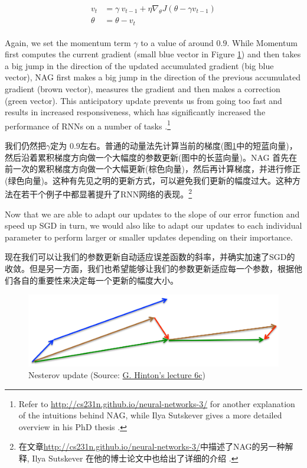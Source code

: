 \documentclass{article}
\begin{document}
\begin{align}
\begin{split}
v_t &= \gamma \: v_{t-1} + \eta \nabla_\theta J( \theta - \gamma v_{t-1})\\
\theta &= \theta - v_t
\end{split}
\end{align}

Again, we set the momentum term $\gamma$ to a value of around $0.9$. While Momentum first computes the current gradient (small blue vector in Figure \ref{fig:nesterov update}) and then takes a big jump in the direction of the updated accumulated gradient (big blue vector), NAG first makes a big jump in the direction of the previous accumulated gradient (brown vector), measures the gradient and then makes a correction (green vector). This anticipatory update prevents us from going too fast and results in increased responsiveness, which has significantly increased the performance of RNNs on a number of tasks \cite{Bengio2012a}.\footnote{Refer to \url{http://cs231n.github.io/neural-networks-3/} for another explanation of the intuitions behind NAG, while Ilya Sutskever gives a more detailed overview in his PhD thesis \cite{Sutskever2013a}.}

我们仍然把$\gamma$定为 $0.9$左右。普通的动量法先计算当前的梯度(图\ref{fig:nesterov update}中的短蓝向量)，然后沿着累积梯度方向做一个大幅度的参数更新(图中的长蓝向量)。NAG 首先在前一次的累积梯度方向做一个大幅更新(棕色向量)，然后再计算梯度，并进行修正(绿色向量)。这种有先见之明的更新方式，可以避免我们更新的幅度过大。这种方法在若干个例子中都显著提升了RNN网络的表现\cite{Bengio2012a}。\footnote{在文章\url{http://cs231n.github.io/neural-networks-3/}中描述了NAG的另一种解释, Ilya Sutskever 在他的博士论文中也给出了详细的介绍 \cite{Sutskever2013a}.}

Now that we are able to adapt our updates to the slope of our error function and speed up SGD in turn, we would also like to adapt our updates to each individual parameter to perform larger or smaller updates depending on their importance.

现在我们可以让我们的参数更新自动适应误差函数的斜率，并确实加速了SGD的收敛。但是另一方面，我们也希望能够让我们的参数更新适应每一个参数，根据他们各自的重要性来决定每一个更新的幅度大小。

\begin{figure}
	\centering
  	\includegraphics[width=0.4\linewidth]{images/nesterov_update_vector.png}
  	\caption{Nesterov update (Source: \href{
http://www.cs.toronto.edu/~tijmen/csc321/slides/lecture_slides_lec6.pdf}{G. Hinton's lecture 6c})}
  	\label{fig:nesterov update}
\end{figure}
\end{document}
